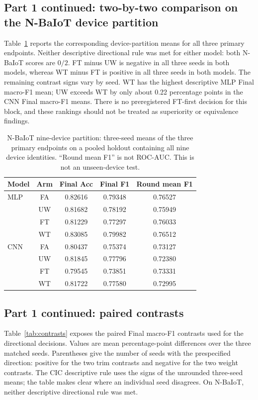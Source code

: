 \documentclass{ieeeaccess}
\begin{document}
\subsection{Part 1 continued: two-by-two comparison on the N-BaIoT device partition}
Table~\ref{tab:e2} reports the corresponding device-partition means for all three primary endpoints. Neither descriptive directional rule was met for either model: both N-BaIoT scores are $0/2$. FT minus UW is negative in all three seeds in both models, whereas WT minus FT is positive in all three seeds in both models. The remaining contrast signs vary by seed. WT has the highest descriptive MLP Final macro-F1 mean; UW exceeds WT by only about 0.22 percentage points in the CNN Final macro-F1 means. There is no preregistered FT-first decision for this block, and these rankings should not be treated as superiority or equivalence findings.

\begin{table}[!t]
\centering
\caption{N-BaIoT nine-device partition: three-seed means of the three primary endpoints on a pooled holdout containing all nine device identities. ``Round mean F1'' is not ROC-AUC. This is not an unseen-device test.}
\label{tab:e2}
\small
\begin{tabular}{lcccc}
\hline
Model & Arm & Final Acc & Final F1 & Round mean F1 \\
\hline
MLP & FA & 0.82616 & 0.79348 & 0.76527 \\
    & UW & 0.81682 & 0.78192 & 0.75949 \\
    & FT & 0.81229 & 0.77297 & 0.76033 \\
    & WT & 0.83085 & 0.79982 & 0.76512 \\
CNN & FA & 0.80437 & 0.75374 & 0.73127 \\
    & UW & 0.81845 & 0.77796 & 0.72380 \\
    & FT & 0.79545 & 0.73851 & 0.73331 \\
    & WT & 0.81722 & 0.77580 & 0.72995 \\
\hline
\end{tabular}
\end{table}

\subsection{Part 1 continued: paired contrasts}
Table~\ref{tab:contrasts} exposes the paired Final macro-F1 contrasts used for the directional decisions. Values are mean percentage-point differences over the three matched seeds. Parentheses give the number of seeds with the prespecified direction: positive for the two trim contrasts and negative for the two weight contrasts. The CIC descriptive rule uses the signs of the unrounded three-seed means; the table makes clear where an individual seed disagrees. On N-BaIoT, neither descriptive directional rule was met.
\end{document}
